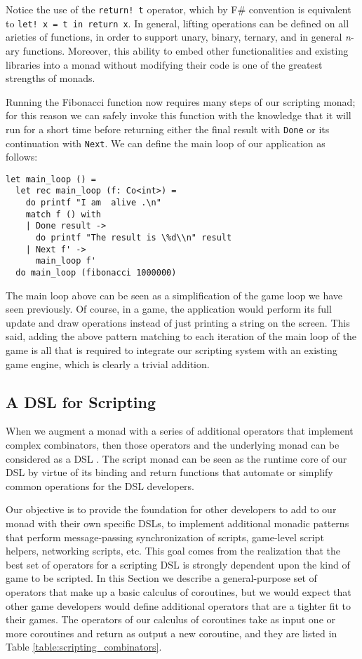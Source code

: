 Notice the use of the \texttt{return! t} operator, which by F\# convention is equivalent to \texttt{let! x = t in return x}. In general, lifting operations can be defined on all arieties of functions, in order to support unary, binary, ternary, and in general \textit{n}-ary functions. Moreover, this ability to embed other functionalities and existing libraries into a monad without modifying their code is one of the greatest strengths of monads.

Running the Fibonacci function now requires many steps of our scripting monad; for this reason we can safely invoke this function with the knowledge that it will run for a short time before returning either the final result with \texttt{Done}
or its continuation with \texttt{Next}. We can define the main loop of our application as follows:

\begin{lstlisting}
let main_loop () =
  let rec main_loop (f: Co<int>) =
    do printf "I am  alive .\n"
    match f () with
    | Done result ->
      do printf "The result is \%d\\n" result
    | Next f' ->
      main_loop f'
  do main_loop (fibonacci 1000000)
\end{lstlisting}

The main loop above can be seen as a simplification of the game loop we have seen previously. Of course, in a game, the application would perform its full update and draw operations instead of just printing a string on the screen. This said, adding the above pattern matching to each iteration of the main loop of the game is all that is required to integrate our scripting system with an existing game engine, which is clearly a trivial addition.

\subsection{A DSL for Scripting}
When we augment a monad with a series of additional operators that implement complex combinators, then those operators and the underlying monad can be considered as a DSL \cite{CHAPTER_6_MONADIC_DSL}. The script monad can be seen as the runtime core of our DSL by virtue of its binding and return functions that automate or simplify common operations for the DSL developers.

Our objective is to provide the foundation for other developers to add to our monad with their own specific DSLs, to implement additional monadic patterns that perform message-passing synchronization of scripts, game-level script helpers, networking scripts, etc. This goal comes from the realization that the best set of operators for a scripting DSL is strongly
dependent upon the kind of game to be scripted. In this Section we describe a general-purpose set of operators that make up a basic calculus of coroutines, but we would expect that other game developers would define additional operators that are a tighter fit to their games. The operators of our calculus of coroutines take as input one or more coroutines and return as output a new coroutine, and they are listed in Table \ref{table:scripting_combinators}.

